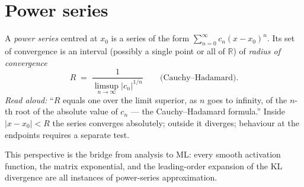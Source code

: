 \documentclass[11pt]{article}
\theoremstyle{definition}
\begin{document}
\section{Power series}

A \emph{power series} centred at $x_0$ is a series of the form
$\sum_{n=0}^{\infty} c_n (x - x_0)^n$. Its set of convergence is an interval
(possibly a single point or all of $\mathbb{R}$) of \emph{radius of
convergence}
\[
  R \;=\; \frac{1}{\limsup_{n \to \infty} |c_n|^{1/n}}
  \qquad \text{(Cauchy--Hadamard).}
\]
\emph{Read aloud:} ``$R$ equals one over the limit superior, as $n$ goes to
infinity, of the $n$-th root of the absolute value of $c_n$ --- the
Cauchy--Hadamard formula.''
Inside $|x - x_0| < R$ the series converges absolutely; outside it diverges;
behaviour at the endpoints requires a separate test.

This perspective is the bridge from analysis to ML: every smooth activation
function, the matrix exponential, and the leading-order expansion of the
KL divergence are all instances of power-series approximation.
\end{document}
